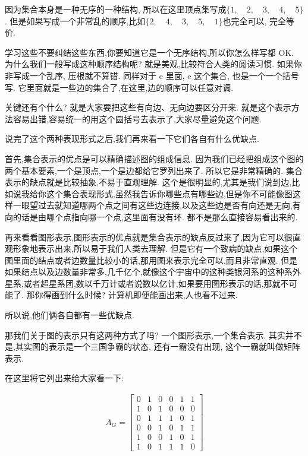因为集合本身是一种无序的一种结构, 所以在这里顶点集写成$\{1, \quad 2, \quad 3, \quad 4, \quad 5\}$. 但是如果写成一个非常乱的顺序,比如$\{2, \quad 4, \quad 3, \quad 5, \quad 1\}$也完全可以, 完全等价. 

学习这些不要纠结这些东西,你要知道它是一个无序结构,所以你怎么样写都 OK. 为什么我们一般写成这种顺序结构呢? 就是美观,比较符合人类的阅读习惯. 如果你非写成一个乱序, 压根就不算错. 同样对于 e 里面, e 这个集合, 也是一个一个括号写. 它里面就是一些边的集合了,在这里,边的顺序可以任意对调. 

关键还有个什么? 就是大家要把这些有向边、无向边要区分开来. 就是这个表示方法容易出错,容易统一的用这个圆括号去表示了,大家尽量避免这个问题. 

说完了这个两种表现形式之后,我们再来看一下它们各自有什么优缺点. 

首先,集合表示的优点是可以精确描述图的组成信息. 因为我们已经把组成这个图的两个基本要素,一个是顶点,一个是边都给它罗列出来了. 所以它是非常精确的. 集合表示的缺点就是比较抽象,不易于直观理解. 这个是很明显的,尤其是我们说到边,比如说我给你这个集合表现形式,虽然我告诉你哪些点有哪些边,但是你不可能像图这样一眼望过去就知道哪两个点之间有这些边连接,以及这些边是否有向还是无向,有向的话是由哪个点指向哪一个点,这里面有没有环. 都不是那么直接容易看出来的. 

再来看看图形表示,图形表示的优点就是集合表示的缺点反过来了,因为它可以很直观形象地表示出来,所以易于我们人类去理解. 但是它有一个致病的缺点,如果这个图里面的结点或者边数量比较小的话,那用图来表示完全可以,而且非常直观. 但是如果结点以及边数量非常多,几千亿个,就像这个宇宙中的这种类银河系的这种系外星系,或者超星系团,数以千万计或者说数以亿计,如果要用图形表示的话,那就不可能了. 那你得画到什么时候? 计算机即便能画出来,人也看不过来. 

所以说,他们俩各自都有一些优缺点. 

那我们关于图的表示只有这两种方式了吗? 一个图形表示,一个集合表示. 其实并不是,其实图的表示是一个三国争霸的状态, 还有一霸没有出现, 这个一霸就叫做矩阵表示. 

在这里将它列出来给大家看一下: 

\begin{align*}
  A_G = \begin{bmatrix}
  0 & 1 & 0 & 0 & 1 & 1 \\  
  1 & 0 & 1 & 0 & 0 & 0 \\
  0 & 1 & 1 & 1 & 0 & 1 \\ 
  0 & 0 & 1 & 0 & 1 & 1 \\ 
  1 & 0 & 0 & 1 & 0 & 1 \\
  1 & 0 & 1 & 1 & 1 & 0
  \end{bmatrix} 
\end{align*}

